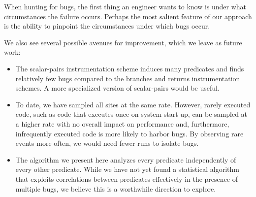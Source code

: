 \documentclass[draft]{sig-alternate}
\begin{document}
When hunting for bugs, the first thing an engineer wants to know is
under what circumstances the failure occurs.  Perhaps the most salient
feature of our approach is the ability to pinpoint the circumstances
under which bugs occur.

We also see several possible avenues for improvement, which we leave
as future work:
\begin{itemize}

\item The scalar-pairs instrumentation scheme induces many
predicates and finds relatively few bugs compared to the branches and
returns instrumentation schemes.  A more specialized version of scalar-pairs
would be useful.

\item To date, we have sampled all sites at the same rate.  However,
rarely executed code, such as code that executes once on system start-up,
can be sampled at a higher rate with no overall impact on performance and,
furthermore, infrequently executed code is more likely
to harbor bugs.  By observing rare events more often, we would need fewer
runs to isolate bugs.

\item The algorithm we present here analyzes every predicate independently
of every other predicate.  While we have not yet found a statistical algorithm that exploits
correlations between predicates effectively in the presence of
multiple bugs, we believe this is a worthwhile direction
to explore.
\end{itemize}



\end{document}

